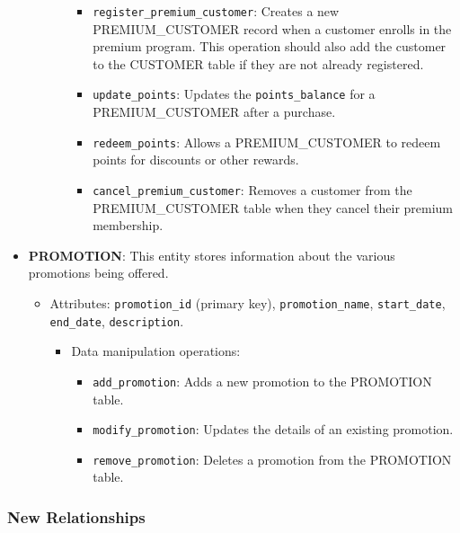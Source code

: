 \documentclass[
]{report}
\providecommand{\tightlist}{%
  \setlength{\itemsep}{0pt}\setlength{\parskip}{0pt}}\usepackage{longtable,booktabs,array}
\begin{document}
\begin{itemize}
\begin{itemize}
\begin{itemize}
      \begin{itemize}
      \tightlist
      \item
        \texttt{register\_premium\_customer}: Creates a new
        PREMIUM\_CUSTOMER record when a customer enrolls in the premium
        program. This operation should also add the customer to the
        CUSTOMER table if they are not already registered.
      \item
        \texttt{update\_points}: Updates the \texttt{points\_balance}
        for a PREMIUM\_CUSTOMER after a purchase.
      \item
        \texttt{redeem\_points}: Allows a PREMIUM\_CUSTOMER to redeem
        points for discounts or other rewards.
      \item
        \texttt{cancel\_premium\_customer}: Removes a customer from the
        PREMIUM\_CUSTOMER table when they cancel their premium
        membership.
      \end{itemize}
    \end{itemize}
  \end{itemize}
\item
  \textbf{PROMOTION}: This entity stores information about the various
  promotions being offered.

  \begin{itemize}
  \item
    Attributes: \texttt{promotion\_id} (primary key),
    \texttt{promotion\_name}, \texttt{start\_date}, \texttt{end\_date},
    \texttt{description}.

    \begin{itemize}
    \item
      Data manipulation operations:

      \begin{itemize}
      \tightlist
      \item
        \texttt{add\_promotion}: Adds a new promotion to the PROMOTION
        table.
      \item
        \texttt{modify\_promotion}: Updates the details of an existing
        promotion.
      \item
        \texttt{remove\_promotion}: Deletes a promotion from the
        PROMOTION table.
      \end{itemize}
    \end{itemize}
  \end{itemize}
\end{itemize}

\subsubsection{\texorpdfstring{\textbf{New
Relationships}}{New Relationships}}\label{new-relationships}
\end{document}
